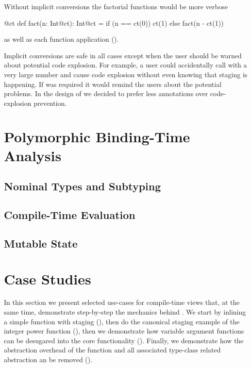 Without implicit conversions the factorial functions would be more verbose\begin{lstparagraph}
@ct def fact(n: Int@ct): Int@ct =   if (n == ct(0)) ct(1)
else fact(n - ct(1))
\end{lstparagraph}

as well as each function application ().

Implicit conversions are safe in all cases except when the user should be warned about potential
code explosion. For example, a user could accidentally call  with a very large number and
cause code explosion without even knowing that staging is happening. If  was required
it would remind the users about the potential problems. In the design of \ct we decided to
prefer less annotations over code-explosion prevention.


\section{Polymorphic Binding-Time Analysis} \label{sct:bta}





\subsection{Nominal Types and Subtyping}
\label{sct:nominal-types}

\subsection{Compile-Time Evaluation}
\label{sct:evaluation}

\subsection{Mutable State}
\label{sct:mutable-state}


\section{Case Studies}
\label{sct:case-studies}

In this section we present selected use-cases for compile-time views that, at the
same time, demonstrate step-by-step the mechanics behind \ct. We start by inlining a simple function with staging
(), then do the canonical staging  example of the integer power function
(), then we demonstrate how variable argument functions can
be  desugared into the core functionality (). Finally, we
demonstrate how the abstraction overhead of the  function and all
associated type-class related abstraction an be removed ().


